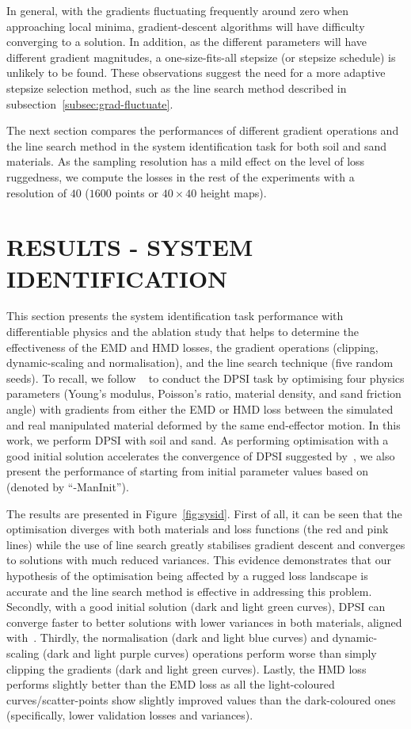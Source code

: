 \documentclass[letterpaper, 10 pt, journal, twoside]{ieeetran}
\begin{document}
In general, with the gradients fluctuating frequently around zero when approaching local minima, gradient-descent algorithms will have difficulty converging to a solution. In addition, as the different parameters will have different gradient magnitudes, a one-size-fits-all stepsize (or stepsize schedule) is unlikely to be found. These observations suggest the need for a more adaptive stepsize selection method, such as the line search method described in subsection~\ref{subsec:grad-fluctuate}. 

The next section compares the performances of different gradient operations and the line search method in the system identification task for both soil and sand materials. As the sampling resolution has a mild effect on the level of loss ruggedness, we compute the losses in the rest of the experiments with a resolution of $40$ ($1600$ points or $40\times40$ height maps).

\section{RESULTS - SYSTEM IDENTIFICATION}\label{sec:result-sysid}

This section presents the system identification task performance with differentiable physics and the ablation study that helps to determine the effectiveness of the EMD and HMD losses, the gradient operations (clipping, dynamic-scaling and normalisation), and the line search technique (five random seeds). To recall, we follow ~\cite{xy2024sysid} to conduct the DPSI task by optimising four physics parameters (Young's modulus, Poisson's ratio, material density, and sand friction angle) with gradients from either the EMD or HMD loss between the simulated and real manipulated material deformed by the same end-effector motion. In this work, we perform DPSI with soil and sand. As performing optimisation with a good initial solution accelerates the convergence of DPSI suggested by~\cite{xy2024sysid}, we also present the performance of starting from initial parameter values based on~\cite{StructX} (denoted by ``-ManInit'').

The results are presented in Figure~\ref{fig:sysid}. First of all, it can be seen that the optimisation diverges with both materials and loss functions (the red and pink lines) while the use of line search greatly stabilises gradient descent and converges to solutions with much reduced variances. This evidence demonstrates that our hypothesis of the optimisation being affected by a rugged loss landscape is accurate and the line search method is effective in addressing this problem. Secondly, with a good initial solution (dark and light green curves), DPSI can converge faster to better solutions with lower variances in both materials, aligned with~\cite{xy2024sysid}. Thirdly, the normalisation (dark and light blue curves) and dynamic-scaling (dark and light purple curves) operations perform worse than simply clipping the gradients (dark and light green curves). Lastly, the HMD loss performs slightly better than the EMD loss as all the light-coloured curves/scatter-points show slightly improved values than the dark-coloured ones (specifically, lower validation losses and variances).
\end{document}

